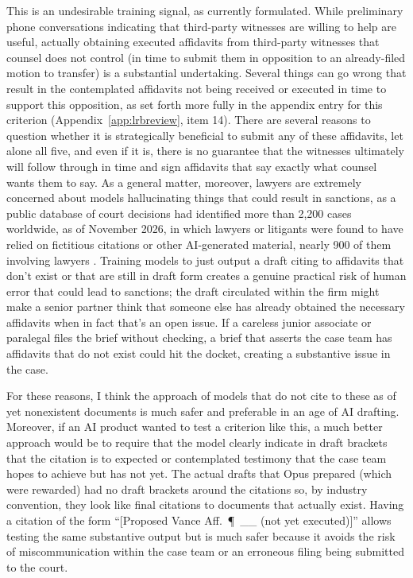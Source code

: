 \documentclass[11pt]{article}
\begin{document}
This is an undesirable training signal, as currently formulated. While preliminary phone conversations indicating that third-party witnesses are willing to help are useful, actually obtaining executed affidavits from third-party witnesses that counsel does not control (in time to submit them in opposition to an already-filed motion to transfer) is a substantial undertaking. Several things can go wrong that result in the contemplated affidavits not being received or executed in time to support this opposition, as set forth more fully in the appendix entry for this criterion (Appendix~\ref{app:lrbreview}, item 14). There are several reasons to question whether it is strategically beneficial to submit any of these affidavits, let alone all five, and even if it is, there is no guarantee that the witnesses ultimately will follow through in time and sign affidavits that say exactly what counsel wants them to say. As a general matter, moreover, lawyers are extremely concerned about models hallucinating things that could result in sanctions, as a public database of court decisions had identified more than 2,200 cases worldwide, as of November 2026, in which lawyers or litigants were found to have relied on fictitious citations or other AI-generated material, nearly 900 of them involving lawyers \citep{charlotinDatabase}. Training models to just output a draft citing to affidavits that don't exist or that are still in draft form creates a genuine practical risk of human error that could lead to sanctions; the draft circulated within the firm might make a senior partner think that someone else has already obtained the necessary affidavits when in fact that's an open issue. If a careless junior associate or paralegal files the brief without checking, a brief that asserts the case team has affidavits that do not exist could hit the docket, creating a substantive issue in the case.

For these reasons, I think the approach of models that do not cite to these as of yet nonexistent documents is much safer and preferable in an age of AI drafting. Moreover, if an AI product wanted to test a criterion like this, a much better approach would be to require that the model clearly indicate in draft brackets that the citation is to expected or contemplated testimony that the case team hopes to achieve but has not yet. The actual drafts that Opus prepared (which were rewarded) had no draft brackets around the citations so, by industry convention, they look like final citations to documents that actually exist. Having a citation of the form ``[Proposed Vance Aff.\ \P~\_\_ (not yet executed)]'' allows testing the same substantive output but is much safer because it avoids the risk of miscommunication within the case team or an erroneous filing being submitted to the court.
\end{document}
